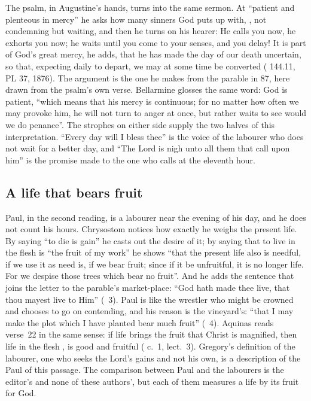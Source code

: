 The psalm, in Augustine's hands, turns into the same sermon. At ``patient and
plenteous in mercy'' he asks how many sinners God puts up with, , not condemning but waiting, and then he turns on his
hearer:  He calls you now, he exhorts you now; he waits until you come
to your senses, and you delay! It is part of God's great mercy, he adds, that
he has made the day of our death uncertain, so that, expecting daily to
depart, we may at some time be converted (
144.11, PL 37, 1876). The argument is the one he makes from the parable in
 87, here drawn from the psalm's own verse. Bellarmine glosses the
same word: God is patient, ``which means that his mercy is continuous; for no
matter how often we may provoke him, he will not turn to anger at once, but
rather waits to see would we do penance''. The strophes on either side supply
the two halves of this interpretation. ``Every day will I bless thee'' is the
voice of the labourer who does not wait for a better day, and ``The Lord is
nigh unto all them that call upon him'' is the promise made to the one who
calls at the eleventh hour.

\subsection{A life that bears fruit}

Paul, in the second reading, is a labourer near the evening of his day, and he
does not count his hours. Chrysostom notices how exactly he weighs the present
life. By saying ``to die is gain'' he casts out the desire of it; by saying
that to live in the flesh is ``the fruit of my work'' he shows ``that the
present life also is needful, if we use it as need is, if we bear fruit; since
if it be unfruitful, it is no longer life. For we despise those trees which
bear no fruit''. And he adds the sentence that joins the letter to the
parable's market-place: ``God hath made thee live, that thou mayest live to
Him'' (~3). Paul is like the wrestler who might
be crowned and chooses to go on contending, and his reason is the vineyard's:
``that I may make the plot which I have planted bear much fruit'' (~4). Aquinas reads verse~22 in the same sense: if life brings
the fruit that Christ is magnified, then life in the flesh , is good and fruitful ( c.~1, lect.~3).
Gregory's definition of the labourer, one who seeks the Lord's gains and not
his own, is a description of the Paul of this passage. The comparison between
Paul and the labourers is the editor's and none of these authors', but each of
them measures a life by its fruit for God.

